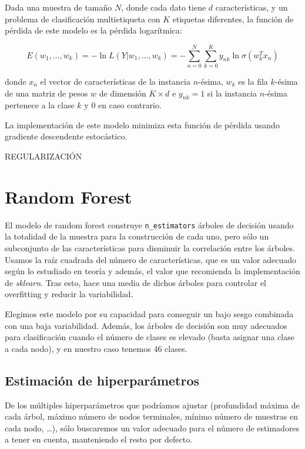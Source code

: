 \documentclass[a4]{article}
\begin{document}
Dada una muestra de tamaño $N$, donde cada dato tiene $d$
características, y un problema de clasificación multietiqueta con $K$
etiquetas diferentes, la función de pérdida de este modelo es la
pérdida logarítmica:

\[ E(w_1, \ldots, w_k) = -\ln L(Y|w_1, \ldots, w_k) = -\sum\limits_{n=0}^{N}\sum\limits_{k=0}^{K} y_{nk}\ln \sigma (w^T_kx_n)\]

donde $x_n$ el vector de características de la instancia $n$-ésima,
$w_k$ es la fila $k$-ésima de una matriz de pesos $w$ de dimensión
$K \times d$ e $y_{nk} = 1$ si la instancia $n$-ésima pertenece a la
clase $k$ y $0$ en caso contrario.

La implementación de este modelo minimiza esta función de pérdida
usando gradiente descendente estocástico.

REGULARIZACIÓN


\section{Random Forest}

El modelo de random forest construye \texttt{n\_estimators} árboles de
decisión usando la totalidad de la muestra para la construcción de
cada uno, pero sólo un subconjunto de las características para
disminuir la correlación entre los árboles. Usamos la raíz cuadrada
del número de características, que es un valor adecuado según lo
estudiado en teoría y además, el valor que recomienda la
implementación de \textit{sklearn}. Tras esto, hace una media de
dichos árboles para controlar el overfitting y reducir la
variabilidad.

Elegimos este modelo por su capacidad para conseguir un bajo sesgo
combinada con una baja variabilidad. Además, los árboles de decisión
son muy adecuados para clasificación cuando el número de clases es
elevado (basta asignar una clase a cada nodo), y en nuestro caso
tenemos 46 clases.

\subsection{Estimación de hiperparámetros}

De los múltiples hiperparámetros que podríamos ajustar (profundidad
máxima de cada árbol, máximo número de nodos terminales, mínimo número
de muestras en cada nodo, \ldots), sólo buscaremos un valor adecuado
para el número de estimadores a tener en cuenta, manteniendo el resto
por defecto.
\end{document}
